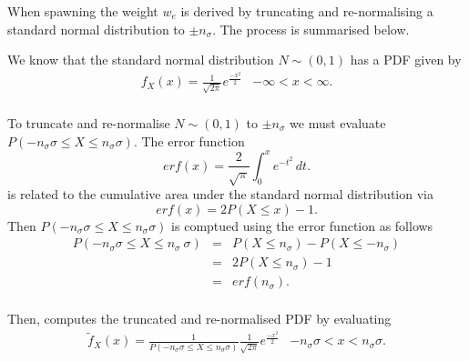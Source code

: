 When spawning the weight $w_e$ is derived by
truncating and re-normalising a standard normal distribution to
$\pm n_\sigma$. The process is summarised below.

We know that the standard normal distribution $ N \sim (0,1)$ has
a PDF given by
\begin{equation}
\begin{array}{lr}
f_X(x)=\frac{1}{\sqrt{2\pi}}e^{\frac{-x^2}{2}} & - \infty <x<
\infty.
\\
\end{array}
\end{equation}

To truncate and re-normalise $N \sim (0,1)$ to $\pm n_\sigma$ we
must evaluate $P(-n_\sigma \sigma \leq X \leq n_\sigma \sigma)$.
The error function
\begin{equation}
erf(x) = \frac{2}{\sqrt{\pi}} \int_{0}^{x} e^{-t^2} \, dt.
\end{equation}
is related to the cumulative area under the standard normal
distribution via
\begin{equation}
erf(x) = 2P(X \leq x)-1.
\end{equation}
Then $P(-n_\sigma
\sigma \leq X \leq n_\sigma \sigma)$ is comptued using the error function as
follows
\begin{equation}
\begin{array}{rcl}
P(-n_\sigma \sigma \leq X \leq n_\sigma\ \sigma)  & = & P(X \leq
n_\sigma)-P(X \leq -n_\sigma) \\
   & = & 2P(X \leq n_\sigma)-1 \\
    & = & erf(n_\sigma) . \\
\end{array}
\end{equation}

Then,  computes the truncated and
re-normalised PDF by evaluating
\begin{equation}
\begin{array}{lr}
\tilde{f}_X(x)= \frac{1}{P(-n_\sigma \sigma \leq X \leq n_\sigma
\sigma)}
\frac{1}{\sqrt{2\pi}}e^{ \frac{-x^2}{2}} & -n_\sigma \sigma <x< n_\sigma \sigma. \\
\end{array}
\end{equation}


